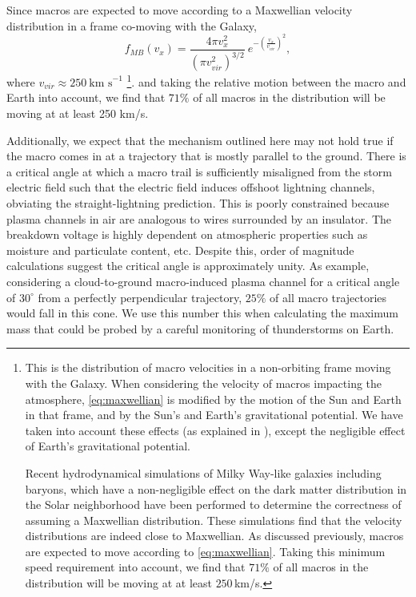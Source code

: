 \documentclass[%
 reprint,
 amsmath,amssymb,
 aps,
 nofootinbib, %
]{revtex4-2}
\begin{document}
        Since macros are expected to move according to a Maxwellian velocity distribution in a frame co-moving with the Galaxy,
        \begin{equation}\label{eq:maxwellian}
        	f_{MB}(v_x) = 
        		\frac{4\pi v_x^2}
        		{\left({\pi v_{vir}^2}\right)^{3/2}}~
        		e^{-\left(\frac{v_x}{v_{vir}}\right)^2}, 
        \end{equation}
        where $v_{vir} \approx 250~ \text{km s}^{-1}$ \footnote{
        	This is the distribution of macro velocities in a non-orbiting frame moving with the Galaxy. When considering the velocity of macros impacting the atmosphere, \eqref{eq:maxwellian} is modified by the motion of the Sun and Earth in that frame, and by the Sun's and Earth's gravitational potential. We have taken into account these effects (as explained in \citet{Freese2013}), except the negligible effect of Earth's gravitational potential.

        	Recent hydrodynamical simulations of Milky Way-like galaxies including baryons, which have a non-negligible effect on the dark matter distribution in the Solar neighborhood \citep{Tanabashi2018} have been performed to determine the correctness of assuming a Maxwellian distribution. These simulations find that the velocity distributions are indeed close to Maxwellian. As discussed previously, macros are expected to move according to \eqref{eq:maxwellian}. Taking this minimum speed requirement into account, we find that $71\%$ of all macros in the distribution will be moving at at least $250\,$km/s. 
    	}.
        and taking the relative motion between the macro and Earth into account, we find that $71\%$ of all macros in the distribution will be moving at at least 250 km/s.

        Additionally, we expect that the mechanism outlined here may not hold true if the macro comes in at a trajectory that is mostly parallel to the ground. There is a critical angle at which a macro trail is sufficiently misaligned from the storm electric field such that the electric field induces offshoot lightning channels, obviating the straight-lightning prediction. This is poorly constrained because plasma channels in air are analogous to wires surrounded by an insulator. The breakdown voltage is highly dependent on atmospheric properties such as moisture and particulate content, etc. Despite this, order of magnitude calculations suggest the critical angle is approximately unity. As example, considering a cloud-to-ground macro-induced plasma channel for a critical angle of $30^\circ$ from a perfectly perpendicular trajectory, $25\%$ of all macro trajectories would fall in this cone. We use this number this when calculating the maximum mass that could be probed by a careful monitoring of thunderstorms on Earth.
\end{document}
